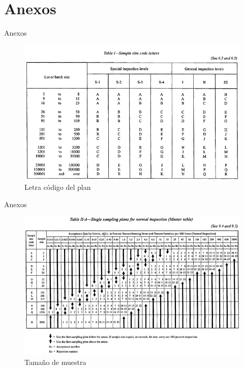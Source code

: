 \documentclass[10pt]{beamer}
\begin{document}
\section{Anexos}
\begin{frame}{Anexos}
\begin{figure}[h!]
  \centering
  \includegraphics[scale=0.55]{FigurasUV/letra.png}
  \caption{Letra código del plan}
\end{figure}
\end{frame}

\begin{frame}{Anexos}
\begin{figure}[h!]
  \centering
  \includegraphics[scale=0.6]{FigurasUV/n.png}
  \caption{Tamaño de muestra}
\end{figure}
\end{frame}
\end{document}
